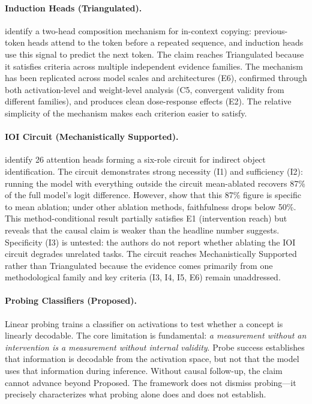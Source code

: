 \documentclass[10pt]{article}
\begin{document}
\paragraph{Induction Heads (Triangulated).} \citet{olsson2022context} identify a two-head composition mechanism for in-context copying: previous-token heads attend to the token before a repeated sequence, and induction heads use this signal to predict the next token. The claim reaches Triangulated because it satisfies criteria across multiple independent evidence families. The mechanism has been replicated across model scales and architectures (E6), confirmed through both activation-level and weight-level analysis (C5, convergent validity from different families), and produces clean dose-response effects (E2). The relative simplicity of the mechanism makes each criterion easier to satisfy.

\paragraph{IOI Circuit (Mechanistically Supported).} \citet{wang2023interpretability} identify 26 attention heads forming a six-role circuit for indirect object identification. The circuit demonstrates strong necessity (I1) and sufficiency (I2): running the model with everything outside the circuit mean-ablated recovers 87\% of the full model's logit difference. However, \citet{miller2024transformer} show that this 87\% figure is specific to mean ablation; under other ablation methods, faithfulness drops below 50\%. This method-conditional result partially satisfies E1 (intervention reach) but reveals that the causal claim is weaker than the headline number suggests. Specificity (I3) is untested: the authors do not report whether ablating the IOI circuit degrades unrelated tasks. The circuit reaches Mechanistically Supported rather than Triangulated because the evidence comes primarily from one methodological family and key criteria (I3, I4, I5, E6) remain unaddressed.

\paragraph{Probing Classifiers (Proposed).} Linear probing \citep{belinkov2022probing} trains a classifier on activations to test whether a concept is linearly decodable. The core limitation is fundamental: \emph{a measurement without an intervention is a measurement without internal validity}. Probe success establishes that information is decodable from the activation space, but not that the model uses that information during inference. Without causal follow-up, the claim cannot advance beyond Proposed. The framework does not dismiss probing---it precisely characterizes what probing alone does and does not establish.
\end{document}
